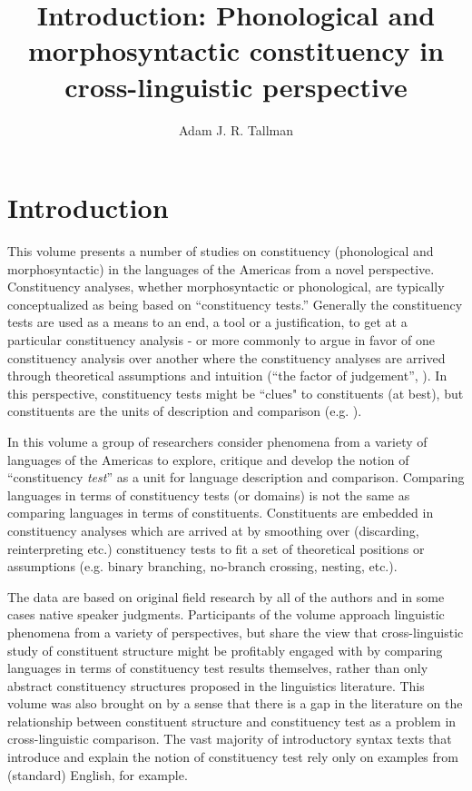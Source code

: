 \documentclass[output=paper,hidelinks]{langscibook}
\author{Adam J. R. Tallman\affiliation{Friedrich Schiller Universität}}
\title[Introduction]{Introduction: Phonological and morphosyntactic constituency in cross-linguistic perspective}
\begin{document}
\maketitle

\section{Introduction}

This volume presents a number of studies on constituency (phonological and morphosyntactic) in the languages of the Americas from a novel perspective. Constituency analyses, whether morphosyntactic or phonological, are typically conceptualized as being based on ``constituency tests.'' Generally the constituency tests are used as a means to an end, a tool or a justification, to get at a particular constituency analysis - or more commonly to argue in favor of one constituency analysis over another where the constituency analyses are arrived through theoretical assumptions and intuition (``the factor of judgement'', \citealt[75]{pike1943taxemes}). In this perspective, constituency tests might be ``clues" to constituents (at best), but constituents are the units of description and comparison (e.g. \citealt[44]{wiltschko2014universal}).

In this volume a group of researchers consider phenomena from a variety of languages of the Americas to explore, critique and develop the notion of ``constituency \textit{test}'' as a unit for language description and comparison. Comparing languages in terms  of constituency tests (or domains) is not the same as comparing languages in terms of constituents. Constituents are embedded in constituency analyses which are arrived at by smoothing over (discarding, reinterpreting etc.) constituency tests to fit a set of theoretical positions or assumptions (e.g. binary branching, no-branch crossing, nesting, etc.).

The data are based on original field research by all of the authors and in some cases native speaker judgments. Participants of the volume approach linguistic phenomena from a variety of perspectives, but share the view that cross-linguistic study of constituent structure might be profitably engaged with by comparing languages in terms of constituency test results themselves, rather than only abstract constituency structures proposed in the linguistics literature. This volume was also brought on by a sense that there is a gap in the literature on the relationship between constituent structure and constituency test as a problem in cross-linguistic comparison. The vast majority of introductory syntax texts that introduce and explain the notion of constituency test rely only on examples from (standard) English, for example.
\end{document}
